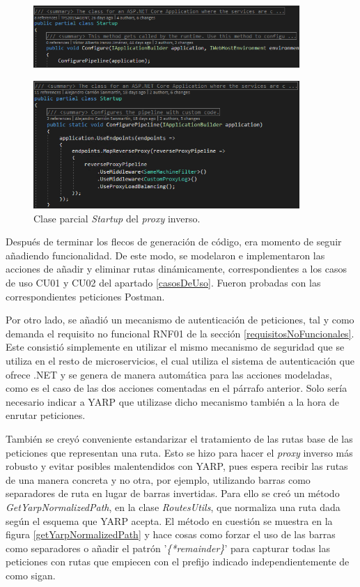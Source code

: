 \documentclass[11pt,spanish,listoffigures]{tfgetsinf}
\begin{document}
\begin{figure}[ht]
\centering
\includegraphics[width=0.9\textwidth]{imagenes/startup}
\end{figure}
\begin{figure}[ht]
\centering
\includegraphics[width=0.9\textwidth]{imagenes/startupParcial}
\caption{Clase parcial \emph{Startup} del \emph{proxy} inverso.}
	\label{startup}
\end{figure}

Después de terminar los flecos de generación de código, era momento de seguir añadiendo funcionalidad. De este modo, se modelaron e implementaron las acciones de añadir y eliminar rutas dinámicamente, correspondientes a los casos de uso CU01 y CU02 del apartado \ref{casosDeUso}. Fueron probadas con las correspondientes peticiones Postman.

Por otro lado, se añadió un mecanismo de autenticación de peticiones, tal y como demanda el requisito no funcional RNF01 de la sección \ref{requisitosNoFuncionales}. Este consistió simplemente en utilizar el mismo mecanismo de seguridad que se utiliza en el resto de microservicios, el cual utiliza el sistema de autenticación que ofrece .NET y se genera de manera automática para las acciones modeladas, como es el caso de las dos acciones comentadas en el párrafo anterior. Solo sería necesario indicar a YARP que utilizase dicho mecanismo también a la hora de enrutar peticiones.

También se creyó conveniente estandarizar el tratamiento de las rutas base de las peticiones que representan una ruta. Esto se hizo para hacer el \emph{proxy} inverso más robusto y evitar posibles malentendidos con YARP, pues espera recibir las rutas de una manera concreta y no otra, por ejemplo, utilizando barras como separadores de ruta en lugar de barras invertidas. Para ello se creó un método \emph{GetYarpNormalizedPath}, en la clase \emph{RoutesUtils}, que normaliza una ruta dada según el esquema que YARP acepta. El método en cuestión se muestra en la figura \ref{getYarpNormalizedPath} y hace cosas como forzar el uso de las barras como separadores o añadir el patrón '\emph{\{*remainder\}}' para capturar todas las peticiones con rutas que empiecen con el prefijo indicado independientemente de como sigan.
\end{document}
